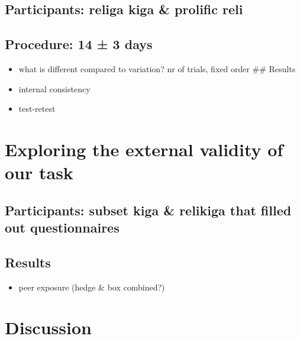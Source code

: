 \documentclass[
  english,
  man,floatsintext]{apa6}
\providecommand{\tightlist}{%
  \setlength{\itemsep}{0pt}\setlength{\parskip}{0pt}}
\begin{document}
\hypertarget{participants-religa-kiga-prolific-reli}{%
\subsection{Participants: religa kiga \& prolific reli}\label{participants-religa-kiga-prolific-reli}}

\hypertarget{procedure-14-3-days}{%
\subsection{Procedure: 14 ± 3 days}\label{procedure-14-3-days}}

\begin{itemize}
\tightlist
\item
  what is different compared to variation? nr of trials, fixed order
  \#\# Results
\item
  internal consistency
\item
  test-retest
\end{itemize}

\hypertarget{exploring-the-external-validity-of-our-task}{%
\section{Exploring the external validity of our task}\label{exploring-the-external-validity-of-our-task}}

\hypertarget{participants-subset-kiga-relikiga-that-filled-out-questionnaires}{%
\subsection{Participants: subset kiga \& relikiga that filled out questionnaires}\label{participants-subset-kiga-relikiga-that-filled-out-questionnaires}}

\hypertarget{results-4}{%
\subsection{Results}\label{results-4}}

\begin{itemize}
\tightlist
\item
  peer exposure (hedge \& box combined?)
\end{itemize}

\hypertarget{discussion-1}{%
\section{Discussion}\label{discussion-1}}
\end{document}
